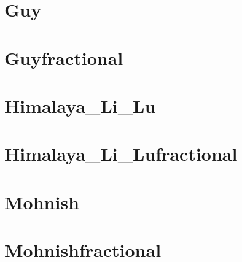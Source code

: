 \documentclass[letterpaper,10pt,english]{sphinxmanual}
\begin{document}
\sphinxstepscope


\chapter{Guy}
\label{\detokenize{Guy2021-09-30:guy}}\label{\detokenize{Guy2021-09-30::doc}}
\noindent{}

\sphinxstepscope


\chapter{Guyfractional}
\label{\detokenize{Guyfractional2021-09-30:guyfractional}}\label{\detokenize{Guyfractional2021-09-30::doc}}
\noindent{}

\sphinxstepscope


\chapter{Himalaya\_Li\_Lu}
\label{\detokenize{Himalaya_Li_Lu2021-09-30:himalaya-li-lu}}\label{\detokenize{Himalaya_Li_Lu2021-09-30::doc}}
\noindent{}

\sphinxstepscope


\chapter{Himalaya\_Li\_Lufractional}
\label{\detokenize{Himalaya_Li_Lufractional2021-09-30:himalaya-li-lufractional}}\label{\detokenize{Himalaya_Li_Lufractional2021-09-30::doc}}
\noindent{}

\sphinxstepscope


\chapter{Mohnish}
\label{\detokenize{Mohnish2021-09-30:mohnish}}\label{\detokenize{Mohnish2021-09-30::doc}}
\noindent{}

\sphinxstepscope


\chapter{Mohnishfractional}
\label{\detokenize{Mohnishfractional2021-09-30:mohnishfractional}}\label{\detokenize{Mohnishfractional2021-09-30::doc}}
\noindent{}
\end{document}
